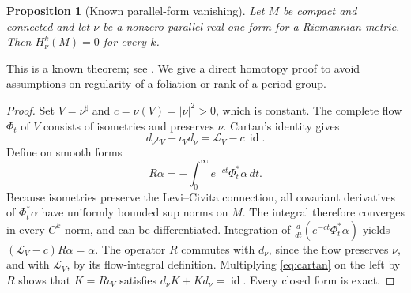 \documentclass[12pt]{amsart}
\newtheorem{prop}[thm]{Proposition}
\theoremstyle{definition}
\theoremstyle{remark}
\numberwithin{equation}{section}
\newcommand{\cL}{\mathcal{L}}
\DeclareMathOperator{\id}{id}
\begin{document}
\begin{prop}[Known parallel-form vanishing]\label{prop:vanishing}
Let $M$ be compact and connected and let $\nu$ be a nonzero parallel real one-form for a Riemannian metric. Then $H^k_\nu(M)=0$ for every $k$.
\end{prop}
This is a known theorem; see \cite[Theorem 3.15]{LLMP}. We give a direct homotopy proof to avoid assumptions on regularity of a foliation or rank of a period group.
\begin{proof}
Set $V=\nu^\sharp$ and $c=\nu(V)=|\nu|^2>0$, which is constant. The complete flow $\Phi_t$ of $V$ consists of isometries and preserves $\nu$. Cartan's identity gives
\begin{equation}\label{eq:cartan}
 d_\nu\iota_V+\iota_Vd_\nu=\cL_V-c\,\id.
\end{equation}
Define on smooth forms
\[
 R\alpha=-\int_0^\infty e^{-ct}\Phi_t^*\alpha\,dt.
\]
Because isometries preserve the Levi--Civita connection, all covariant derivatives of $\Phi_t^*\alpha$ have uniformly bounded sup norms on $M$. The integral therefore converges in every $C^k$ norm, and can be differentiated. Integration of
$\frac{d}{dt}(e^{-ct}\Phi_t^*\alpha)$ yields
$(\cL_V-c)R\alpha=\alpha$. The operator $R$ commutes with $d_\nu$, since the flow preserves $\nu$, and with $\cL_V$, by its flow-integral definition. Multiplying \eqref{eq:cartan} on the left by $R$ shows that $K=R\iota_V$ satisfies $d_\nu K+Kd_\nu=\id$. Every closed form is exact.
\end{proof}
\end{document}
